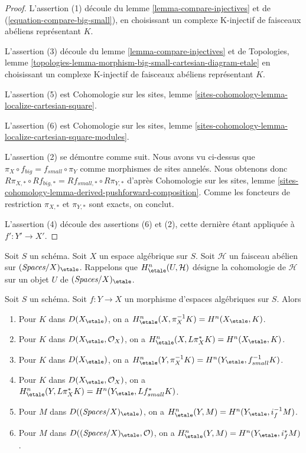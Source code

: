 \begin{proof}
L'assertion (1) découle du lemme \ref{lemma-compare-injectives}
et de (\ref{equation-compare-big-small}),
en choisissant un complexe K-injectif de faisceaux abéliens représentant $K$.

\medskip\noindent
L'assertion (3) découle du lemme \ref{lemma-compare-injectives}
et de Topologies, lemme
\ref{topologies-lemma-morphism-big-small-cartesian-diagram-etale}
en choisissant un complexe K-injectif de faisceaux abéliens représentant $K$.

\medskip\noindent
L'assertion (5) est Cohomologie sur les sites, lemme
\ref{sites-cohomology-lemma-localize-cartesian-square}.

\medskip\noindent
L'assertion (6) est Cohomologie sur les sites, lemme
\ref{sites-cohomology-lemma-localize-cartesian-square-modules}.

\medskip\noindent
L'assertion (2) se démontre comme suit. Nous avons vu ci-dessus que
$\pi_X \circ f_{big} = f_{small} \circ \pi_Y$ comme morphismes de sites
annelés. Nous obtenons donc
$R\pi_{X, *} \circ Rf_{big, *} = Rf_{small, *} \circ R\pi_{Y, *}$
d'après Cohomologie sur les sites, lemme
\ref{sites-cohomology-lemma-derived-pushforward-composition}.
Comme les foncteurs de restriction $\pi_{X, *}$ et $\pi_{Y, *}$
sont exacts, on conclut.

\medskip\noindent
L'assertion (4) découle des assertions (6) et (2), cette dernière étant
appliquée à $f' : Y' \to X'$.
\end{proof}

\noindent
Soit $S$ un schéma. Soit $X$ un espace algébrique sur $S$.
Soit $\mathcal{H}$ un faisceau abélien sur
$(\textit{Spaces}/X)_\etale$. Rappelons que $H^n_\etale(U, \mathcal{H})$
désigne la cohomologie de $\mathcal{H}$ sur un objet
$U$ de $(\textit{Spaces}/X)_\etale$.

\begin{lemma}
\label{lemma-compare-cohomology}
Soit $S$ un schéma.
Soit $f : Y \to X$ un morphisme d'espaces algébriques sur $S$. Alors
\begin{enumerate}
\item Pour $K$ dans $D(X_\etale)$, on a
$H^n_\etale(X, \pi_X^{-1}K) = H^n(X_\etale, K)$.
\item Pour $K$ dans $D(X_\etale, \mathcal{O}_X)$, on a
$H^n_\etale(X, L\pi_X^*K) = H^n(X_\etale, K)$.
\item Pour $K$ dans $D(X_\etale)$, on a
$H^n_\etale(Y, \pi_X^{-1}K) = H^n(Y_\etale, f_{small}^{-1}K)$.
\item Pour $K$ dans $D(X_\etale, \mathcal{O}_X)$, on a
$H^n_\etale(Y, L\pi_X^*K) = H^n(Y_\etale, Lf_{small}^*K)$.
\item Pour $M$ dans $D((\textit{Spaces}/X)_\etale)$, on a
$H^n_\etale(Y, M) = H^n(Y_\etale, i_f^{-1}M)$.
\item Pour $M$ dans $D((\textit{Spaces}/X)_\etale, \mathcal{O})$, on a
$H^n_\etale(Y, M) = H^n(Y_\etale, i_f^*M)$.
\end{enumerate}
\end{lemma}


